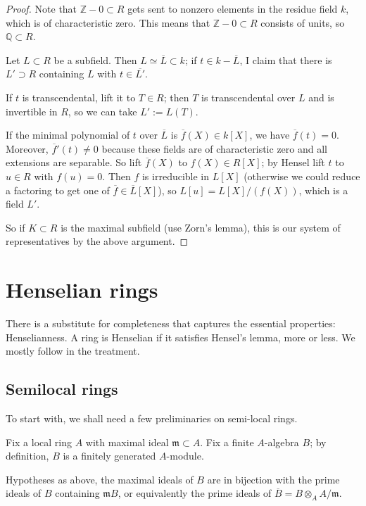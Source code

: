 \begin{proof} 
Note that $\mathbb{Z}-0 \subset R$ gets sent to nonzero elements in the residue field $k$, which is of characteristic zero.  This means that $\mathbb{Z}-0 \subset R$ consists of units, so $\mathbb{Q} \subset R$.

Let $L \subset R$ be a subfield.  Then $L \simeq \overline{L} \subset k$; if $t \in k - \overline{ L}$, I claim that there is $L' \supset R$ containing $L$ with $t \in \overline{L'}$.

If $t$ is transcendental, lift it to $T \in R$; then $T$ is transcendental over $L$ and is invertible in $R$, so we can take $L' := L(T)$.

If the minimal polynomial of $t$ over $\overline{L}$ is $\overline{f}(X) \in k[X]$, we have $\overline{f}(t) = 0$.  Moreover, $\overline{f}'(t) \neq 0$ because these fields are of characteristic zero and all extensions are separable.
So lift $\overline{f}(X)$ to $f(X) \in R[X]$; by Hensel lift $t$ to $u \in R$ with $f(u) = 0$.  Then $f$ is irreducible in $L[X]$ (otherwise we could reduce a factoring to get one of $\overline{f} \in \overline{L}[X]$), so $L[u] = L[X]/(f(X))$, which is a field $L'$.

So if $K \subset R$ is the maximal subfield (use Zorn's lemma), this is our system of representatives by the above argument.
\end{proof} 


\section{Henselian rings}



There is a substitute for completeness that captures the essential
properties: Henselianness. A ring is Henselian if it satisfies
Hensel's lemma, more or less. We mostly follow \cite{Ra70} in the treatment.

\subsection{Semilocal rings}

To start with, we shall need a few preliminaries on semi-local rings.

Fix a local ring $A$ with maximal ideal $\mathfrak{m} \subset A$.
Fix a finite $A$-algebra $B$; by definition, $B $ is a finitely
generated $A$-module.

\begin{proposition} 
Hypotheses as above, the maximal ideals of $B$ are in bijection with
the prime ideals of $B $ containing $\mathfrak{m} B$, or equivalently
the prime ideals of $\overline{B} = B \otimes_A A/\mathfrak{m}$.
\end{proposition}

